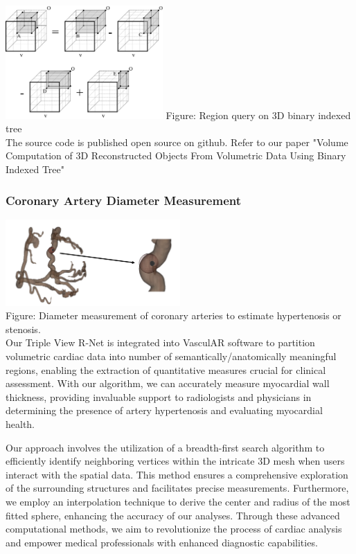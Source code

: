 \documentclass{article}
\begin{document}
\begin{multicols}{2}
\includegraphics[width=0.45\textwidth]{figures/3D BIT.png}
Figure: Region query on 3D binary indexed tree  \\

The source code is published open source on github. Refer to our paper "Volume Computation of 3D Reconstructed Objects From Volumetric
Data Using Binary Indexed Tree"


\subsubsection{Coronary Artery Diameter Measurement}
\includegraphics[width=0.5\textwidth]{figures/sphere.png} \\
Figure: Diameter measurement of coronary arteries to estimate hypertenosis or stenosis. \\

Our Triple View R-Net is integrated into VasculAR software to partition volumetric cardiac data into number of semantically/anatomically meaningful regions, enabling the extraction of quantitative measures crucial for clinical assessment. With our algorithm, we can accurately measure myocardial wall thickness, providing invaluable support to radiologists and physicians in determining the presence of artery hypertenosis and evaluating myocardial health.

Our approach involves the utilization of a breadth-first search algorithm to efficiently identify neighboring vertices within the intricate 3D mesh when users interact with the spatial data. This method ensures a comprehensive exploration of the surrounding structures and facilitates precise measurements. Furthermore, we employ an interpolation technique to derive the center and radius of the most fitted sphere, enhancing the accuracy of our analyses. Through these advanced computational methods, we aim to revolutionize the process of cardiac analysis and empower medical professionals with enhanced diagnostic capabilities.



\end{multicols}
\end{document}
